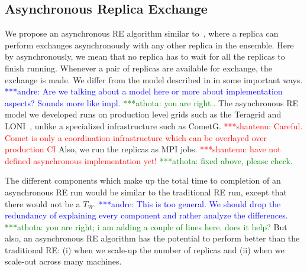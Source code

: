 \documentclass{rspublic}
\newcommand{\jhanote}[1]{ {\textcolor{red} { ***shantenu: #1 }}}
\newcommand{\alnote}[1]{ {\textcolor{blue} { ***andre: #1 }}}
\newcommand{\athotanote}[1]{ {\textcolor{green} { ***athota: #1 }}}
\newcommand{\alnote}[1]{}
\newcommand{\athotanote}[1]{}
\newcommand{\jhanote}[1]{}
\begin{document}
  
\subsection{Asynchronous Replica Exchange}


We propose an asynchronous RE algorithm similar
to~\citep{parashar_arepex}, where a replica can perform exchanges
asynchronously with any other replica in the ensemble. Here by asynchronously, we mean that no replica has to wait for all the replicas to finish running. Whenever a pair of replicas are available for exchange, the exchange is made. %
We differ from the model described in \citep{parashar_arepex}
in some important ways. \alnote{Are we talking about a model here or 
more about implementation aspects? Sounds more like impl.}\athotanote{you are right..}
The asynchronous RE model we developed runs on
production level grids such as the Teragrid and LONI~\citep{LONI_web},
unlike a specialized infrastructure such as CometG.
\jhanote{Careful. Comet is only a coordination infrastructure which
  can be overlayed over production CI} Also, we run the replicas as
MPI jobs. \jhanote{have not defined asynchronous implementation yet!} \athotanote{fixed above, please check.}


The different components which make up the total time to completion of 
an asynchronous RE run would be similar to the traditional RE run, 
except that there would not be a $T_W$. \alnote{This is too general. 
We should drop the redundancy of explaining every component and rather 
analyze the differences.} \athotanote{you are right; i am adding a couple of lines here. does it help?}But also, an asynchronous RE algorithm has the potential to perform better than the traditional RE: (i) when we scale-up the number of replicas and (ii) when we scale-out across many machines.
\end{document}
